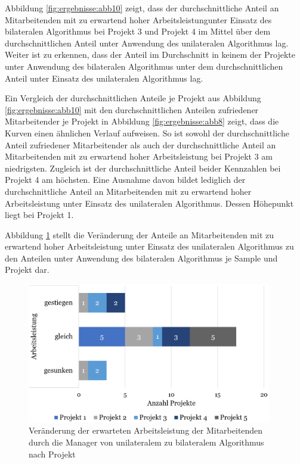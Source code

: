 Abbildung \ref{fig:ergebnisse:abb10} zeigt, dass der durchschnittliche Anteil an Mitarbeitenden mit zu erwartend hoher Arbeitsleistungunter Einsatz des bilateralen Algorithmus bei Projekt 3 und Projekt 4 im Mittel über dem durchschnittlichen Anteil unter Anwendung des unilateralen Algorithmus lag.
Weiter ist zu erkennen, dass der Anteil im Durchschnitt in keinem der Projekte unter Anwendung des bilateralen Algorithmus unter dem durchschnittlichen Anteil unter Einsatz des unilateralen Algorithmus lag.

Ein Vergleich der durchschnittlichen Anteile je Projekt aus Abbildung \ref{fig:ergebnisse:abb10} mit den durchschnittlichen Anteilen zufriedener Mitarbeitender je Projekt in Abbildung \ref{fig:ergebnisse:abb8} zeigt, dass die Kurven einen ähnlichen Verlauf aufweisen.
So ist sowohl der durchschnittliche Anteil zufriedener Mitarbeitender als auch der durchschnittliche Anteil an Mitarbeitenden mit zu erwartend hoher Arbeitsleistung bei Projekt 3 am niedrigsten.
Zugleich ist der durchschnittliche Anteil beider Kennzahlen bei Projekt 4 am höchsten.
Eine Ausnahme davon bildet lediglich der durchschnittliche Anteil an Mitarbeitenden mit zu erwartend hoher Arbeitsleistung unter Einsatz des unilateralen Algorithmus.
Dessen Höhepunkt liegt bei Projekt 1.

Abbildung \ref{fig:ergebnisse:abb11} stellt die Veränderung der Anteile an Mitarbeitenden mit zu erwartend hoher Arbeitsleistung unter Einsatz des unilateralen Algorithmus zu den Anteilen unter Anwendung des bilateralen Algorithmus je Sample und Projekt dar.

\begin{figure}[H]
    \centering
	\includegraphics[width=0.95\textwidth]{gfx/verhaeltnis-a-projekte.png}
	\caption[Veränderung der erwarteten Arbeitsleistung der Mitarbeitenden durch die Manager von unilateralem zu bilateralem Algorithmus nach Projekt]{Veränderung der erwarteten Arbeitsleistung der Mitarbeitenden durch die Manager von unilateralem zu bilateralem Algorithmus nach Projekt}
	\label{fig:ergebnisse:abb11}
\end{figure}


